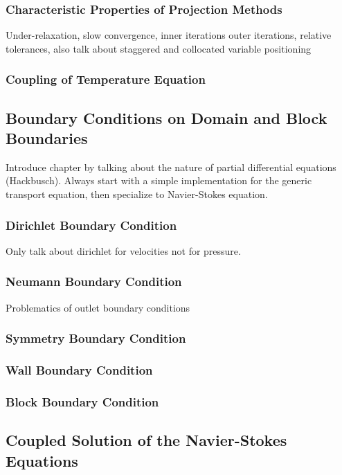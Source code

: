 \documentclass[article,type=msc,colorback,accentcolor=tud2a]{tudthesis}
\begin{document}
      \subsubsection{Characteristic Properties of Projection Methods}

        Under-relaxation, slow convergence, inner iterations outer iterations, relative tolerances, also talk about staggered and collocated variable positioning

      \subsubsection{Coupling of Temperature Equation}

    \subsection{Boundary Conditions on Domain and Block Boundaries}
        Introduce chapter by talking about the nature of partial differential equations (Hackbusch). Always start with a simple implementation for the generic transport equation, then specialize to Navier-Stokes equation.
      \subsubsection{Dirichlet Boundary Condition}
        Only talk about dirichlet for velocities not for pressure.
      \subsubsection{Neumann Boundary Condition}
        Problematics of outlet boundary conditions
      \subsubsection{Symmetry Boundary Condition}
      \subsubsection{Wall Boundary Condition}
      \subsubsection{Block Boundary Condition}
      
    \subsection{Coupled Solution of the Navier-Stokes Equations}
\end{document}
